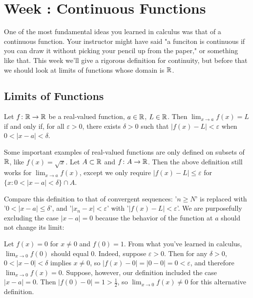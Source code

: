\documentclass[../notes.tex]{subfiles}
\begin{document}
\section{Week \theweek: Continuous Functions}

One of the most fundamental ideas you learned in calculus was that of a continuous function. Your instructor might have said "a funciton is continuous if you can draw it without picking your pencil up from the paper," or something like that. This week we'll give a rigorous definition for continuity, but before that we should look at limits of functions whose domain is $\mathbb R$.

\subsection{Limits of Functions}

\begin{definition}
    Let $f\colon \mathbb R \to \mathbb R$ be a real-valued function, $a\in \mathbb R$, $L\in \mathbb R$. Then $\lim_{x\to a}f(x)=L$ if and only if, for all $\varepsilon>0$, there exists $\delta>0$ such that $|f(x)-L| <\varepsilon$ when $ 0 < |x-a| < \delta$. 
\end{definition}


\begin{remark}
   Some important examples of real-valued functions are only defined on subsets of $\mathbb R$, like $f(x)=\sqrt{x}$. Let $A\subset \mathbb R$ and $f\colon A\to \mathbb R$. Then the above definition still works for $\lim_{x\to a}f(x)$, except we only require $|f(x)-L|\leq \varepsilon$ for $\{x : 0 < |x-a| < \delta\}\cap A$. 
\end{remark}

Compare this definition to that of convergent sequences: '$n\geq N$' is replaced with '$0 < |x-a|\leq \delta$', and '$|x_n-x| < \varepsilon$' with '$|f(x)-L| < \varepsilon$'. We are purposefully excluding the case $|x-a|=0$ because the behavior of the function at $a$ should not change its limit:

\begin{example}
\label{ex:rem-discont}
    Let $f(x) =0$ for $x\neq 0$ and $f(0) =1$. From what you've learned in calculus, $\lim_{x\to 0}f(0)$ should equal $0$. Indeed, suppose $\varepsilon>0$. Then for any $\delta >0$, $0 < |x-0| < \delta$ implies $x\neq 0$, so $|f(x)-0| = |0-0| = 0< \varepsilon$, and therefore $\lim_{x\to 0}f(x) =0$. Suppose, however, our definition included the case $|x-a|=0$. Then $|f(0)-0|=1 > \frac{1}{2}$, so $\lim_{x\to 0}f(x) \neq 0$ for this alternative definition.
\end{example}
\end{document}
